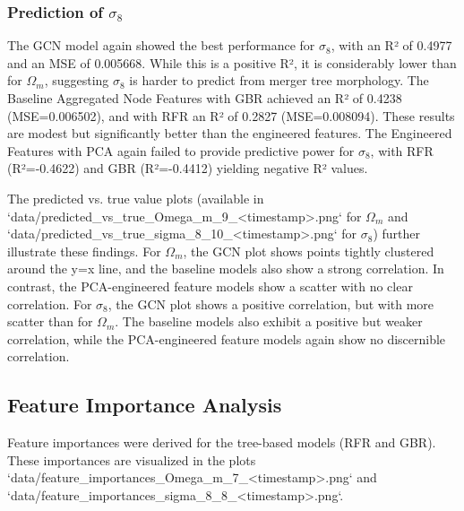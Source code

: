 \documentclass[twocolumn]{aastex631}
\begin{document}
\subsubsection{Prediction of $\sigma_8$}
The GCN model again showed the best performance for $\sigma_8$, with an R² of 0.4977 and an MSE of 0.005668. While this is a positive R², it is considerably lower than for $\Omega_m$, suggesting $\sigma_8$ is harder to predict from merger tree morphology. The Baseline Aggregated Node Features with GBR achieved an R² of 0.4238 (MSE=0.006502), and with RFR an R² of 0.2827 (MSE=0.008094). These results are modest but significantly better than the engineered features. The Engineered Features with PCA again failed to provide predictive power for $\sigma_8$, with RFR (R²=-0.4622) and GBR (R²=-0.4412) yielding negative R² values.

The predicted vs. true value plots (available in `data/predicted_vs_true_Omega_m_9_<timestamp>.png` for $\Omega_m$ and `data/predicted_vs_true_sigma_8_10_<timestamp>.png` for $\sigma_8$) further illustrate these findings. For $\Omega_m$, the GCN plot shows points tightly clustered around the y=x line, and the baseline models also show a strong correlation. In contrast, the PCA-engineered feature models show a scatter with no clear correlation. For $\sigma_8$, the GCN plot shows a positive correlation, but with more scatter than for $\Omega_m$. The baseline models also exhibit a positive but weaker correlation, while the PCA-engineered feature models again show no discernible correlation.

\subsection{Feature Importance Analysis}

Feature importances were derived for the tree-based models (RFR and GBR). These importances are visualized in the plots `data/feature_importances_Omega_m_7_<timestamp>.png` and `data/feature_importances_sigma_8_8_<timestamp>.png`.
\end{document}

